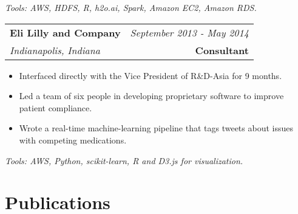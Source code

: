 \documentclass[10pt,a4paper]{article}
\begin{document}
  \vspace*{2mm}\setlength\parindent{2mm}\begin{minipage}{16.8cm}
    \textit{Tools: AWS, HDFS, R, h2o.ai, Spark, Amazon EC2, Amazon RDS.}
  \end{minipage}

  \vspace*{3mm}\noindent\begin{tabularx}{17cm}{X r}
    \textbf{Eli Lilly and Company} & \textit{September 2013 - May 2014} \\
    \textit{Indianapolis, Indiana} & \textbf{Consultant} 
  \end{tabularx}

  \vspace*{1mm}\noindent\begin{minipage}{17cm}
    \begin{itemize}[leftmargin=6mm,topsep=0mm,itemsep=-1mm]
      \item Interfaced directly with the Vice President of R\&D-Asia for 9 months.
      \item Led a team of six people in developing proprietary software to improve patient compliance.
      \item Wrote a real-time machine-learning pipeline that tags tweets about issues with competing medications.
    \end{itemize}
  \end{minipage}

  \vspace*{2mm}\setlength\parindent{2mm}\begin{minipage}{16.8cm}
    \textit{Tools: AWS, Python, scikit-learn, R and D3.js for visualization.} 
  \end{minipage}

  \vspace*{3mm}\section*{Publications}
\end{document}
